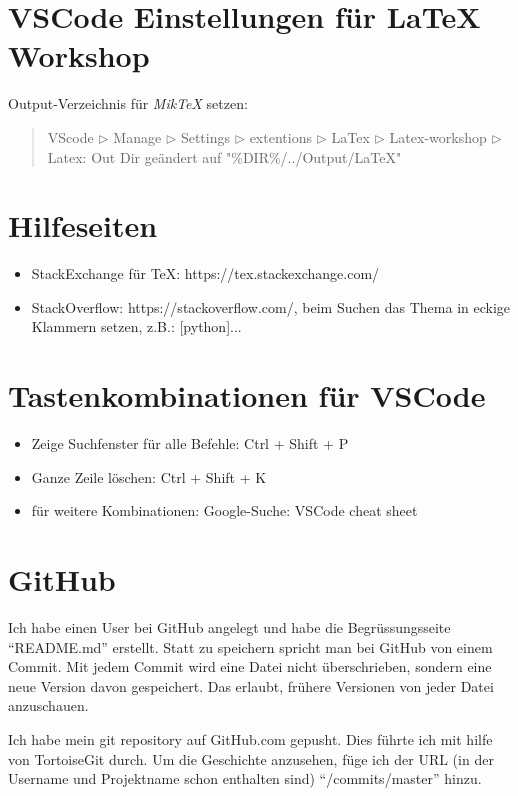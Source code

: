 \documentclass[a4paper]{article} %
\begin{document}
    \section{VSCode Einstellungen für LaTeX Workshop} %
   
    Output-Verzeichnis für \textsl{MikTeX} setzen:
    \begin{quote}
        VScode $\triangleright$ Manage $\triangleright$ Settings $\triangleright$ extentions $\triangleright$ LaTex $\triangleright$ Latex-workshop $\triangleright$ Latex: Out Dir
        geändert auf "\%DIR\%/../Output/LaTeX"
    \end{quote}

    \section{Hilfeseiten} %
  
    \begin{itemize}
        \item StackExchange für TeX: https://tex.stackexchange.com/
        \item StackOverflow: https://stackoverflow.com/,
        beim Suchen das Thema in eckige Klammern setzen,
        z.B.: [python]...
    \end{itemize}

    \section{Tastenkombinationen für VSCode} %
  
    \begin{itemize}
       \item Zeige Suchfenster für alle Befehle: Ctrl + Shift + P
       \item Ganze Zeile löschen: Ctrl + Shift + K
       \item für weitere Kombinationen: Google-Suche: VSCode cheat sheet
    \end{itemize}
      
    \section{GitHub} %
  
    Ich habe einen User bei GitHub angelegt 
    und habe die Begrüssungsseite ``README.md'' erstellt.
    Statt zu speichern spricht man bei GitHub von einem Commit.
    Mit jedem Commit wird eine Datei nicht überschrieben,
    sondern eine neue Version davon gespeichert.
    Das erlaubt, frühere Versionen von jeder Datei anzuschauen.
    
    Ich habe mein git repository auf GitHub.com gepusht.
    Dies führte ich mit hilfe von TortoiseGit durch.
    Um die Geschichte anzusehen, füge ich der URL (in der Username und Projektname schon 
    enthalten sind) ``/commits/master'' hinzu.
    
\end{document}
